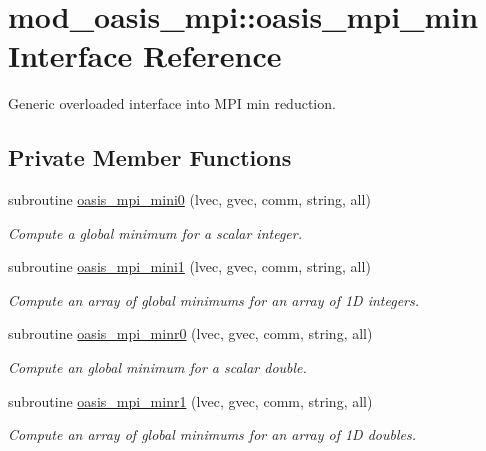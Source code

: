 \hypertarget{interfacemod__oasis__mpi_1_1oasis__mpi__min}{\section{mod\+\_\+oasis\+\_\+mpi\+:\+:oasis\+\_\+mpi\+\_\+min Interface Reference}
\label{interfacemod__oasis__mpi_1_1oasis__mpi__min}
}


Generic overloaded interface into M\+P\+I min reduction.  


\subsection*{Private Member Functions}
\begin{DoxyCompactItemize}
\item 
subroutine \hyperlink{interfacemod__oasis__mpi_1_1oasis__mpi__min_a1deee0fc506aeabafcf4a33866694934}{oasis\+\_\+mpi\+\_\+mini0} (lvec, gvec, comm, string, all)
\begin{DoxyCompactList}\small\item\em Compute a global minimum for a scalar integer. \end{DoxyCompactList}\item 
subroutine \hyperlink{interfacemod__oasis__mpi_1_1oasis__mpi__min_a7f514ac7a5701f4a5ce8612d2e8bcb16}{oasis\+\_\+mpi\+\_\+mini1} (lvec, gvec, comm, string, all)
\begin{DoxyCompactList}\small\item\em Compute an array of global minimums for an array of 1\+D integers. \end{DoxyCompactList}\item 
subroutine \hyperlink{interfacemod__oasis__mpi_1_1oasis__mpi__min_a18098e0abd7924b31d64e06c789aa0c4}{oasis\+\_\+mpi\+\_\+minr0} (lvec, gvec, comm, string, all)
\begin{DoxyCompactList}\small\item\em Compute an global minimum for a scalar double. \end{DoxyCompactList}\item 
subroutine \hyperlink{interfacemod__oasis__mpi_1_1oasis__mpi__min_a62604730fbe7bf0dc21cf9fb9d83e981}{oasis\+\_\+mpi\+\_\+minr1} (lvec, gvec, comm, string, all)
\begin{DoxyCompactList}\small\item\em Compute an array of global minimums for an array of 1\+D doubles. \end{DoxyCompactList}\end{DoxyCompactItemize}


